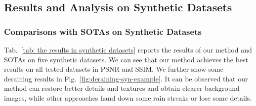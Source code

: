 \documentclass[letterpaper]{article} %
\begin{document}
\subsection{Results and Analysis on Synthetic Datasets}
\subsubsection{Comparisons with SOTAs on Synthetic Datasets}
Tab.~\ref{tab: the results in synthetic datasets} reports the results of our method and SOTAs on five synthetic datasets.
We can see that our method achieves the best results on all tested datasets in PSNR and SSIM.
We further show some deraining results in Fig.~\ref{fig:deraining-syn-example}.
It can be observed that our method can restore better details and textures and obtain clearer background images, while other approaches hand down some rain streaks or lose some details.
\end{document}
